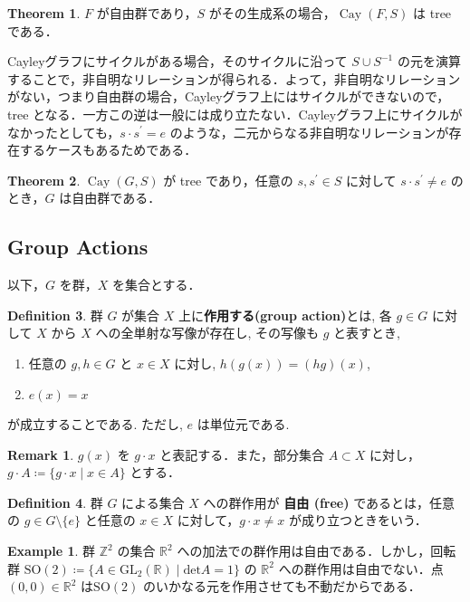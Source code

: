 \documentclass[dvipdfmx]{ujarticle}
\DeclareMathOperator{\Cay}{Cay}
\theoremstyle{definition}
\newtheorem{dfn}{Definition}[section]
\newtheorem{thm}[dfn]{Theorem}
\newtheorem*{rem*}{Remark}
\newtheorem*{ex*}{Example}
\begin{document}
\begin{thm}\label{-tree}
 $F$ が自由群であり，$S$ がその生成系の場合，$\Cay(F,S)$ は treeである．
\end{thm}

Cayleyグラフにサイクルがある場合，そのサイクルに沿って $S\cup S^{-1}$ の元を演算することで，非自明なリレーションが得られる．よって，非自明なリレーションがない，つまり自由群の場合，Cayleyグラフ上にはサイクルができないので，tree となる．一方この逆は一般には成り立たない．Cayleyグラフ上にサイクルがなかったとしても，$s\cdot s^\prime= e$ のような，二元からなる非自明なリレーションが存在するケースもあるためである．

\begin{thm}\label{tree-}
 $\Cay(G,S)$ が tree であり，任意の $s,s^\prime\in S$ に対して $s\cdot s^\prime \neq e$ のとき，$G$ は自由群である．
\end{thm}

\subsection{Group Actions}
 以下，$G$ を群，$X$ を集合とする．

\begin{dfn}
群 $G$ が集合 $X$ 上に\textbf{作用する(group action)}とは, 各 $g\in G$ に対して $X$ から $X$ への全単射な写像が存在し, その写像も $g$ と表すとき, 
\begin{enumerate}
  \item 任意の $g, h\in G$ と $x\in X$ に対し,  $h(g(x))=(hg)(x)$,
  \item $e(x)=x$
\end{enumerate}
が成立することである. ただし, $e$ は単位元である.
\end{dfn}

\begin{rem*}
$g(x)$ を $g\cdot x$ と表記する．また，部分集合 $A\subset X$ に対し，$g\cdot A\coloneqq\{g\cdot x\mid x\in A\}$ とする．
\end{rem*}

\begin{dfn}
 群 $G$ による集合 $X$ への群作用が \textbf{自由 (free)} であるとは，任意の $g\in G\setminus\{e\}$ と任意の $x\in X$ に対して，$g\cdot x\neq x$ が成り立つときをいう．
\end{dfn}

\begin{ex*}
  群 $\mathbb{Z}^2$ の集合 $\mathbb{R}^2$ への加法での群作用は自由である．しかし，回転群 $\mathrm{SO}(2)\coloneqq\{A\in \mathrm{GL}_2(\mathbb{R})\mid \mathrm{det}A=1\}$ の $\mathbb{R}^2$ への群作用は自由でない．点 $(0,0)\in \mathbb{R}^2$ は$\mathrm{SO}(2)$ のいかなる元を作用させても不動だからである．
\end{ex*}
\end{document}
